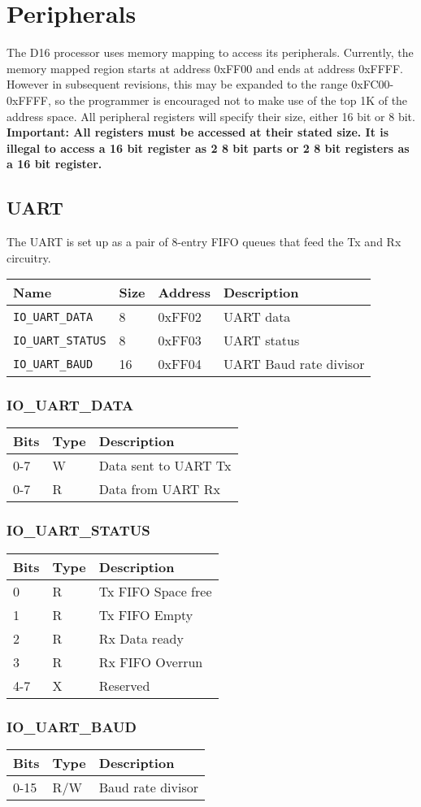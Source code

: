 \documentclass{article}
\begin{document}
	\section{Peripherals}
	The D16 processor uses memory mapping to access its peripherals. Currently, the memory mapped region starts at address 0xFF00 and ends at address 0xFFFF. However in subsequent revisions, this may be expanded to the range 0xFC00-0xFFFF, so the programmer is encouraged not to make use of the top 1K of the address space.
	All peripheral registers will specify their size, either 16 bit or 8 bit. \textbf{Important: All registers must be accessed at their stated size. It is illegal to access a 16 bit register as 2 8 bit parts or 2 8 bit registers as a 16 bit register.}
	\subsection{UART}
	The UART is set up as a pair of 8-entry FIFO queues that feed the Tx and Rx circuitry. \\
	\begin{tabular}{|l|l|l| l|}
	\hline
	Name & Size & Address & Description \\ \hline
	\verb|IO_UART_DATA| & 8 &0xFF02 & UART data \\ \hline
	\verb|IO_UART_STATUS| & 8 & 0xFF03 & UART status \\ \hline
	\verb|IO_UART_BAUD| & 16 & 0xFF04 & UART Baud rate divisor \\ \hline
	
	
	\end{tabular}
	\subsubsection{IO\_UART\_DATA}
	\begin{tabular}{|l|l|l|}
	\hline
	Bits & Type & Description \\ \hline
	0-7 & W & Data sent to UART Tx \\ \hline
	0-7 & R & Data from UART Rx \\ \hline
	\end{tabular}
	\subsubsection{IO\_UART\_STATUS}
	\begin{tabular}{|l|l|l|}
	\hline
	Bits & Type & Description \\ \hline
	0 & R & Tx FIFO Space free \\ \hline
	1 & R & Tx FIFO Empty \\ \hline
	2 & R & Rx Data ready \\ \hline
	3 & R & Rx FIFO Overrun \\ \hline
	4-7 & X & Reserved \\ \hline
\end{tabular}
	\subsubsection{IO\_UART\_BAUD}
	\begin{tabular}{|l|l|l|}
	\hline
	Bits & Type & Description \\ \hline
	0-15 & R/W & Baud rate divisor \\ \hline
	\end{tabular}
\end{document}
